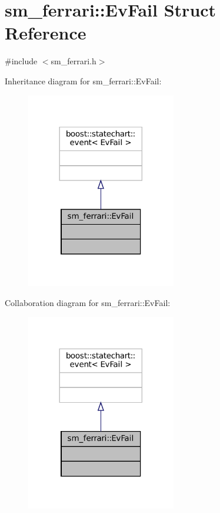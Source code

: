 \hypertarget{structsm__ferrari_1_1EvFail}{}\section{sm\+\_\+ferrari\+:\+:Ev\+Fail Struct Reference}
\label{structsm__ferrari_1_1EvFail}


{\ttfamily \#include $<$sm\+\_\+ferrari.\+h$>$}



Inheritance diagram for sm\+\_\+ferrari\+:\+:Ev\+Fail\+:
\nopagebreak
\begin{figure}[H]
\begin{center}
\leavevmode
\includegraphics[width=185pt]{structsm__ferrari_1_1EvFail__inherit__graph}
\end{center}
\end{figure}


Collaboration diagram for sm\+\_\+ferrari\+:\+:Ev\+Fail\+:
\nopagebreak
\begin{figure}[H]
\begin{center}
\leavevmode
\includegraphics[width=185pt]{structsm__ferrari_1_1EvFail__coll__graph}
\end{center}
\end{figure}


